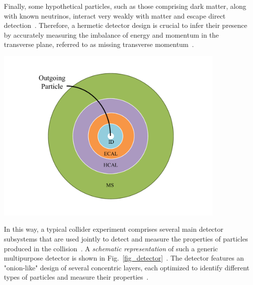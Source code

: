 Finally, some hypothetical particles, such as those comprising dark matter, along with known neutrinos, interact very weakly with matter and escape direct detection~\cite{Bertone2005_DM_review,1674-1137-40-10-100001}. Therefore, a hermetic detector design is crucial to infer their presence by accurately measuring the imbalance of energy and momentum in the transverse plane, referred to as missing transverse momentum~\cite{CMS:2019ctu,CMS:PF2017}.


\begin{center}
    \includegraphics[width=0.85\textwidth]{Images/transversal_detector.pdf}
    \label{fig_detector}
\end{center}

In this way, a typical collider experiment comprises several main detector subsystems that are used jointly to detect and measure the properties of particles produced in the collision~\cite{CMS:2008xjf,ATLAS:2008xda,deFavereau:2013fsa,CMS:PF2017}. A \textit{schematic representation} of such a generic multipurpose detector is shown in Fig.~\ref{fig_detector}~\cite{CMS:2008xjf,deFavereau:2013fsa,Lee:2018pag}. The detector features an "onion-like" design of several concentric layers, each optimized to identify different types of particles and measure their properties~\cite{CMS:2008xjf,CMS:PF2017}.

